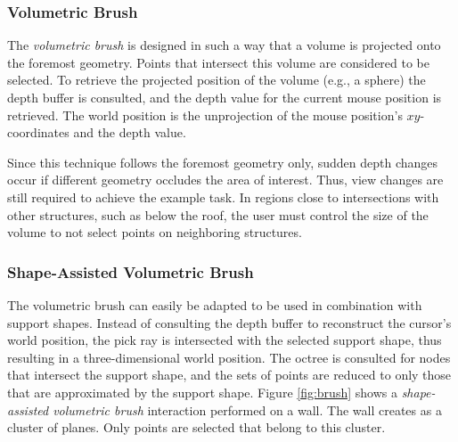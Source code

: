 \subsubsection{Volumetric Brush}

The \textit{volumetric brush} \cite{weyrich2004post, scheiblauer2011out} is designed in such a way that a volume is projected onto the foremost geometry. Points that intersect this volume are considered to be selected. To retrieve the projected position of the volume (e.g., a sphere) the depth buffer is consulted, and the depth value for the current mouse position is retrieved. The world position is the unprojection of the mouse position's $xy$-coordinates and the depth value. 

Since this technique follows the foremost geometry only, sudden depth changes occur if different geometry occludes the area of interest. Thus, view changes are still required to achieve the example task. In regions close to intersections with other structures, such as below the roof, the user must control the size of the volume to not select points on neighboring structures. 


\subsubsection{Shape-Assisted Volumetric Brush}

The volumetric brush can easily be adapted to be used in combination with support shapes. Instead of consulting the depth buffer to reconstruct the cursor’s world position, the pick ray is intersected with the selected support shape, thus resulting in a three-dimensional world position. The octree is consulted for nodes that intersect the support shape, and the sets of points are reduced to only those that are approximated by the support shape. 
Figure \ref{fig:brush} shows a \textit{shape-assisted volumetric brush} interaction performed on a wall. The wall creates as a cluster of planes. Only points are selected that belong to this cluster. 


